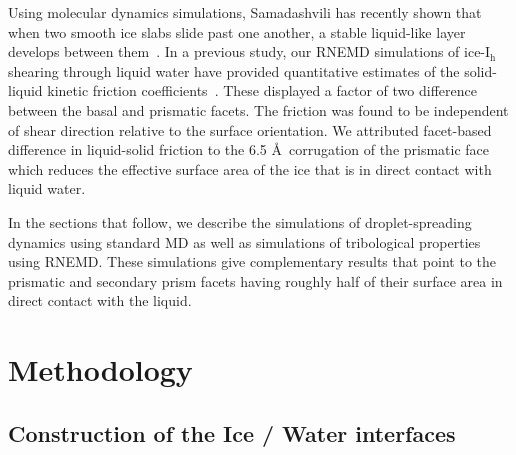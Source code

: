
Using molecular dynamics simulations, Samadashvili has recently shown
that when two smooth ice slabs slide past one another, a stable
liquid-like layer develops between them~\cite{Samadashvili2013}. In a
previous study, our RNEMD simulations of ice-I$_\mathrm{h}$ shearing
through liquid water have provided quantitative estimates of the
solid-liquid kinetic friction coefficients~\cite{Louden2013a}. These
displayed a factor of two difference between the basal and prismatic
facets.  The friction was found to be independent of shear direction
relative to the surface orientation.  We attributed facet-based
difference in liquid-solid friction to the 6.5 \AA\ corrugation of the
prismatic face which reduces the effective surface area of the ice
that is in direct contact with liquid water.

In the sections that follow, we describe the simulations of
droplet-spreading dynamics using standard MD as well as simulations of
tribological properties using RNEMD.  These simulations give
complementary results that point to the prismatic and secondary prism
facets having roughly half of their surface area in direct contact
with the liquid.

\section{Methodology}
\subsection{Construction of the Ice / Water interfaces}

